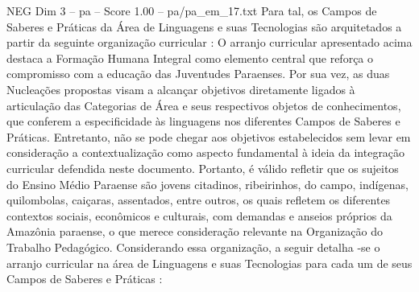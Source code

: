 \begin{textsample}{NEG Dim 3 – pa – Score 1.00 – pa/pa\_em\_17.txt}
Para tal, os Campos de Saberes e Práticas da Área de Linguagens e suas Tecnologias são arquitetados a partir da seguinte organização curricular : O arranjo curricular apresentado acima destaca a Formação Humana Integral como elemento central que reforça o compromisso com a educação das Juventudes Paraenses.
Por sua vez, as duas Nucleações propostas visam a alcançar objetivos diretamente ligados à articulação das Categorias de Área e seus respectivos objetos de conhecimentos, que conferem a especificidade às linguagens nos diferentes Campos de Saberes e Práticas.
Entretanto, não se pode chegar aos objetivos estabelecidos sem levar em consideração a contextualização como aspecto fundamental à ideia da integração curricular defendida neste documento.
Portanto, é válido refletir que os sujeitos do Ensino Médio Paraense são jovens citadinos, ribeirinhos, do campo, indígenas, quilombolas, caiçaras, assentados, entre outros, os quais refletem os diferentes contextos sociais, econômicos e culturais, com demandas e anseios próprios da Amazônia paraense, o que merece consideração relevante na Organização do Trabalho Pedagógico.
Considerando essa organização, a seguir detalha -se o arranjo curricular na área de Linguagens e suas Tecnologias para cada um de seus Campos de Saberes e Práticas :

\end{textsample}
